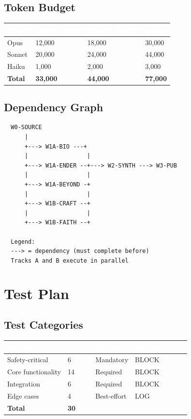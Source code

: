 \documentclass[11pt,letterpaper]{article}
\newcommand{\tableheader}[1]{\textbf{\sffamily\textcolor{white}{#1}}}
\begin{document}
\subsection{Token Budget}

\begin{center}
\begin{tabularx}{\textwidth}{L{4cm}C{2cm}C{2cm}C{2cm}}
\toprule
{}
\tableheader{Model} & \tableheader{Input Tokens} & \tableheader{Output Tokens} & \tableheader{Total} \\
\midrule
Opus & 12,000 & 18,000 & 30,000 \\
Sonnet & 20,000 & 24,000 & 44,000 \\
Haiku & 1,000 & 2,000 & 3,000 \\
\midrule
\textbf{Total} & \textbf{33,000} & \textbf{44,000} & \textbf{77,000} \\
\bottomrule
\end{tabularx}
\end{center}

\subsection{Dependency Graph}

\begin{asciibox}
\begin{verbatim}
  W0-SOURCE
      |
      +---> W1A-BIO ---+
      |                 |
      +---> W1A-ENDER --+---> W2-SYNTH ---> W3-PUB
      |                 |
      +---> W1A-BEYOND -+
      |                 |
      +---> W1B-CRAFT --+
      |                 |
      +---> W1B-FAITH --+

  Legend:
  ---> = dependency (must complete before)
  Tracks A and B execute in parallel
\end{verbatim}
\end{asciibox}

\section{Test Plan}

\subsection{Test Categories}

\begin{center}
\begin{tabularx}{\textwidth}{L{3cm}C{1.5cm}C{2cm}C{2cm}}
\toprule
{}
\tableheader{Category} & \tableheader{Count} & \tableheader{Priority} & \tableheader{Failure Action} \\
\midrule
Safety-critical & 6 & Mandatory & BLOCK \\
Core functionality & 14 & Required & BLOCK \\
Integration & 6 & Required & BLOCK \\
Edge cases & 4 & Best-effort & LOG \\
\midrule
\textbf{Total} & \textbf{30} & & \\
\bottomrule
\end{tabularx}
\end{center}
\end{document}
